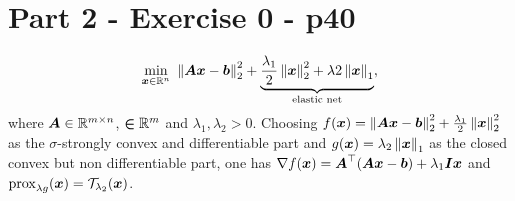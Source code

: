 \section{Part 2 - Exercise 0 - p40}
%
\begin{equation*}
    \min_{\boldsymbol x \in \mathbb{R}^n}~\left\lVert\boldsymbol{Ax}-\boldsymbol b\right\rVert_{2}^2
    + \underbrace{\frac{\lambda_1}{2} \left\lVert\boldsymbol x\right\rVert_{2}^2 
    + \lambda 2 \left\lVert\boldsymbol x\right\rVert_{1}}_{\text{elastic net}},
\end{equation*}
%
where $\boldsymbol A \in \mathbb{R}^{m\times n}$, $\boldsymbol \in \mathbb{R}^m$ and 
$\lambda_1, \lambda_2>0$.
%
Choosing $f(\boldsymbol x) = \left\lVert\boldsymbol{Ax}-\boldsymbol b\right\rVert_{2}^2 
+ \frac{\lambda_1}{2} \left\lVert\boldsymbol x\right\rVert_{2}^2$ as the $\sigma$-strongly 
convex and differentiable part and 
$g(\boldsymbol x) = \lambda_2 \left\lVert\boldsymbol x\right\rVert_{1}$ as the closed 
convex but non differentiable part, one has 
$\nabla f(\boldsymbol x) = \boldsymbol A^\top (\boldsymbol{Ax}-\boldsymbol b) + \lambda_1 
\boldsymbol{Ix}$ and $\operatorname{prox}_{\lambda g}(\boldsymbol x) = 
\mathcal T_{\lambda_2}(\boldsymbol x)$.
%
